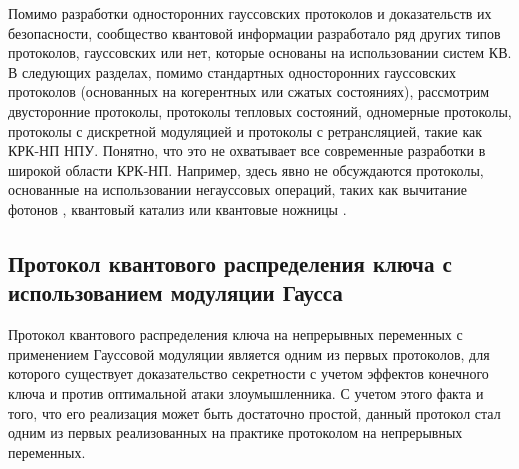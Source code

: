 Помимо разработки односторонних гауссовских протоколов и доказательств их безопасности, сообщество квантовой информации разработало ряд других типов протоколов, гауссовских или нет, которые основаны на использовании систем КВ. В следующих разделах, помимо стандартных односторонних гауссовских протоколов (основанных на когерентных или сжатых состояниях), рассмотрим двусторонние протоколы, протоколы тепловых состояний, одномерные  протоколы, протоколы с дискретной модуляцией и протоколы с ретрансляцией, такие как КРК-НП НПУ. Понятно, что это не охватывает все современные разработки в широкой области КРК-НП. Например, здесь  явно не обсуждаются протоколы, основанные на использовании негауссовых операций, таких как вычитание фотонов \cite{guo2017}, квантовый катализ \cite{guo2019} или квантовые ножницы \cite{ghalaii2020}.


\subsection{Протокол квантового распределения ключа с использованием модуляции Гаусса}\label{sec:ch1/sect4/GG02}
Протокол квантового распределения ключа на непрерывных переменных с применением Гауссовой модуляции является одним из первых протоколов, для которого существует доказательство секретности с учетом эффектов конечного ключа и против оптимальной атаки злоумышленника. С учетом этого факта и того, что его реализация может быть достаточно простой, данный протокол стал одним из первых реализованных на практике протоколом на непрерывных переменных. 
